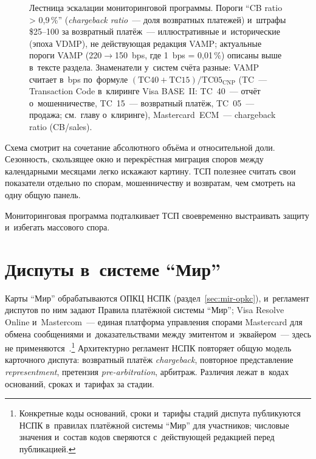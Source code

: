 \begin{figure}[tbp]
  \centering
  \caption{Лестница эскалации мониторинговой программы. Пороги
    \enquote{CB ratio > 0{,}9\,\%} (\textit{chargeback ratio}~--- доля
    возвратных платежей) и~штрафы \$25--100 за возвратный
    платёж~--- иллюстративные и~исторические (эпоха VDMP),
    не действующая редакция VAMP; актуальные пороги VAMP
    (220$\to$150~bps, где 1~bps = 0{,}01\,\%) описаны выше в~тексте раздела. Знаменатели
    у~систем счёта разные: VAMP считает в~bps по~формуле
    $(\text{TC}40+\text{TC}15)/\text{TC}05_{\text{CNP}}$ (TC~--- Transaction
    Code в~клиринге Visa BASE~II: TC~40~--- отчёт о~мошенничестве,
    TC~15~--- возвратный платёж, TC~05~--- продажа; см.~главу о~клиринге),
    Mastercard~ECM~--- chargeback ratio (CB/sales).}\label{fig:monitoring-escalation}
\end{figure}

Схема смотрит на сочетание
абсолютного объёма и относительной доли. Сезонность, скользящее окно и
перекрёстная миграция споров между календарными месяцами легко искажают
картину. ТСП полезнее считать свои показатели отдельно по
спорам, мошенничеству и возвратам, чем смотреть на одну общую панель.

Мониторинговая программа подталкивает ТСП своевременно
выстраивать защиту и~избегать массового спора.

\section{Диспуты в~системе \enquote{Мир}}\label{sec:disputes-mir}

Карты \enquote{Мир} обрабатываются ОПКЦ НСПК (раздел~\ref{sec:mir-opkc}),
и~регламент диспутов по ним задают Правила платёжной системы
\enquote{Мир}; Visa Resolve Online и~Mastercom~--- единая платформа
управления спорами Mastercard для обмена сообщениями и~доказательствами
между эмитентом и~эквайером~--- здесь не применяются~\cite{nspk-mir-rules}.\footnote{Конкретные
коды оснований, сроки и~тарифы стадий диспута публикуются НСПК
в~правилах платёжной системы \enquote{Мир} для участников;
числовые значения и~состав кодов сверяются с~действующей
редакцией перед публикацией.} Архитектурно регламент НСПК
повторяет общую модель карточного диспута: возвратный платёж
\textit{chargeback}, повторное представление \textit{representment}, претензия
\textit{pre-arbitration}, арбитраж. Различия лежат в~кодах оснований,
сроках и~тарифах за стадии.

